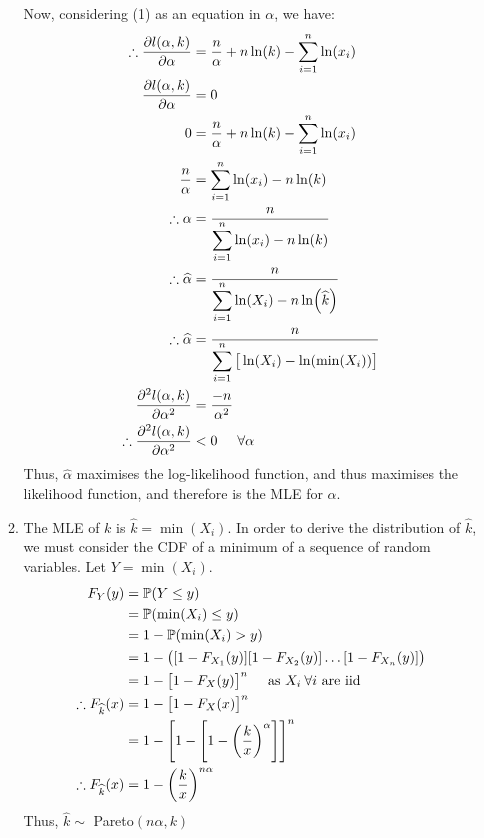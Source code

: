 \documentclass[a4paper]{article}
\newcommand{\p}{\mathbb{P}}
\newcommand{\ds}{\displaystyle}
\begin{document}
\begin{enumerate}
\begin{enumerate}
		Now, considering (1) as an equation in $\ds{\alpha}$, we have:
		\begin{align*}
			\therefore \frac{\partial l(\alpha, k)}{\partial \alpha} & = \frac{n}{\alpha} + n\ln(k) - \sum^n_{i=1}\ln(x_i)\\
			\frac{\partial l(\alpha, k)}{\partial \alpha} & = 0 \\
			0 & = \frac{n}{\alpha} + n\ln(k) - \sum^n_{i=1}\ln(x_i)\\
			\frac{n}{\alpha} & = \sum^n_{i=1}\ln(x_i) - n\ln(k)\\
			\therefore \alpha & = \frac{n}{\ds\sum^n_{i=1}\ln(x_i) - n\ln(k)}\\
			\therefore \widehat{\alpha} & = \frac{n}{\ds\sum^n_{i=1}\ln(X_i) - n\ln(\widehat{k})}\\
			\therefore \widehat{\alpha} & = \frac{n}{\ds\sum^n_{i=1}\big[\ln(X_i) - \ln(\min(X_i))\big]}\\
			\frac{\partial^2 l(\alpha, k)}{\partial \alpha^2} & = \frac{-n}{\alpha^2}\\
			\therefore \frac{\partial^2 l(\alpha, k)}{\partial \alpha^2} & < 0 \hspace{5mm} \forall \alpha\\
		\end{align*}
		Thus, $\ds{\widehat{\alpha}}$ maximises the log-likelihood function, and thus maximises the likelihood function, and therefore is the MLE for $\ds{\alpha}$.

		\item The MLE of $\ds{k}$ is $\ds{\widehat{k} = \min(X_i)}$. In order to derive the distribution of $\ds{\widehat{k}}$, we must consider the CDF of a minimum of a sequence of random variables. Let $\ds{Y = \min(X_i)}$.
		\begin{align*}
			F_Y(y) & = \p(Y \leq y) \\
			& = \p(\min(X_i) \leq y) \\
			& = 1 - \p(\min(X_i) > y) \\
			& = 1 - \big([1-F_{X_1}(y)][1-F_{X_2}(y)]\dots[1-F_{X_n}(y)] \big)\\
			& = 1 - \big[1-F_X(y) \big]^n \hspace{5mm} \text{as $\ds{X_i}\:\forall i$ are iid}\\
			\therefore F_{\widehat{k}}(x) & = 1 - \big[1-F_X(x) \big]^n \\
			& = 1 - \left[1- \Bigg[1-\bigg(\frac{k}{x} \bigg)^{\alpha} \Bigg]\right]^n \\
			\therefore F_{\widehat{k}}(x) & = 1 - \bigg(\frac{k}{x} \bigg)^{n\alpha}\\
		\end{align*}
		Thus, $\ds{\widehat{k} \sim}$ Pareto$\ds{(n\alpha, k)}$


\end{enumerate}
\end{enumerate}
\end{document}
